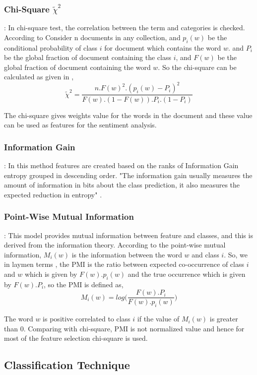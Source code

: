 \documentclass[sigconf]{acmart}
\begin{document}
\subsubsection*{Chi-Square $\tilde{\chi}^2$} : In chi-square test, the correlation between the term and categories is checked. According to \cite{sentianalysis} Consider n documents in any collection, and $p_{i}(w)$ be the conditional probability of class $i$ for document which contains the word $w$. and $P_{i}$ be the global fraction of document containing the class $i$, and $F(w)$ be the global fraction of document containing the word $w$. So the chi-square can be calculated as given in \cite{sentianalysis},
$$\tilde{\chi}^2 = \frac{n.F(w)^{2}.(p_{i}(w)-P_{i})^2}{F(w).(1-F(w)).P_{i}.(1-P_{i})}$$

The chi-square gives weights value for the words in the document and these value can be used as features for the sentiment analysis.

\subsubsection*{Information Gain} : In this method features are created based on the ranks of Information Gain entropy grouped in descending order. "The information gain usually measures the amount of information in bits about the class prediction, it also measures the expected reduction in entropy" \cite{Duch2006}.

\subsubsection*{Point-Wise Mutual Information} : This model provides mutual information between feature and classes, and this is derived from the information theory. According to \cite{sentianalysis} the point-wise mutual information, $M_i(w)$ is the information between the word $w$ and class $i$. So, we in laymen terms , the 
PMI \cite{sentianalysis} is the ratio between expected co-occurrence of class $i$ and $w$ which is given by $F(w).p_i(w)$ and the true occurrence which is given by $F(w).P_i$, so the PMI is defined as,
$$M_i(w) = log\bigg(\frac{F(w).P_i}{F(w).p_i(w)}\bigg)$$

The word $w$ is positive correlated to class $i$ if the value of $M_i(w)$ is greater than 0. Comparing with chi-square, PMI is not normalized value and hence for most of the feature selection chi-square is used.

\subsection{Classification Technique}
\end{document}
